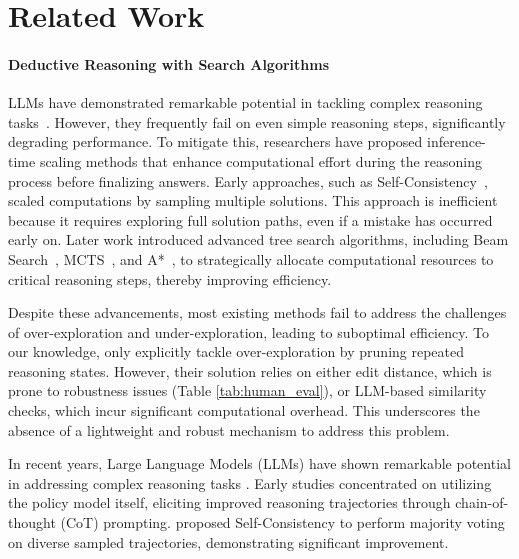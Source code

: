 \section{Related Work}
\paragraph{Deductive Reasoning with Search Algorithms}
LLMs have demonstrated remarkable potential in tackling complex reasoning tasks~\citep{achiam2023gpt,touvron2023llama,jiang2023mistral}.
However, they frequently fail on even simple reasoning steps, significantly degrading performance.
To mitigate this, researchers have proposed inference-time scaling methods that enhance computational effort during the reasoning process before finalizing answers.
Early approaches, such as Self-Consistency~\citep{wang2022self}, scaled computations by sampling multiple solutions.
This approach is inefficient because it requires exploring full solution paths, even if a mistake has occurred early on.
Later work introduced advanced tree search algorithms, including Beam Search~\citep{yao2024tree,zhu2024deductive,yu2024ovm}, MCTS~\citep{tian2024toward,zhang2024accessing}, and A*~\citep{wang2024q,wang2024litesearch}, to strategically allocate computational resources to critical reasoning steps, thereby improving efficiency.

Despite these advancements, most existing methods fail to address the challenges of over-exploration and under-exploration, leading to suboptimal efficiency.
To our knowledge, only \citet{tian2024toward} explicitly tackle over-exploration by pruning repeated reasoning states. However, their solution relies on either edit distance, which is prone to robustness issues (Table \ref{tab:human_eval}), or LLM-based similarity checks, which incur significant computational overhead.
This underscores the absence of a lightweight and robust mechanism to address this problem.

\iffalse
In recent years, Large Language Models (LLMs) have shown remarkable potential in addressing complex reasoning tasks \citep{achiam2023gpt,touvron2023llama,jiang2023mistral}.
Early studies \citep{kojima2022large,wang2022self} concentrated on utilizing the policy model itself, eliciting improved reasoning trajectories through chain-of-thought (CoT) prompting.
\citet{wang2022self} proposed Self-Consistency to perform majority voting on diverse sampled trajectories, demonstrating significant improvement.

